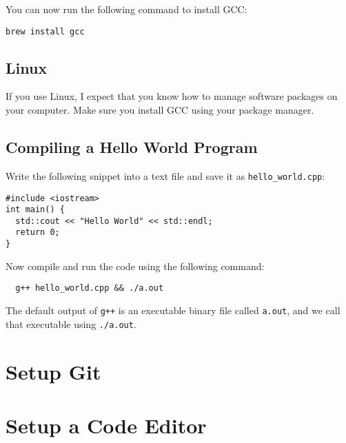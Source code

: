 \documentclass[12pt]{article}
\begin{document}
You can now run the following command to install GCC:
\begin{verbatim}
brew install gcc
\end{verbatim}

\subsection{Linux}

If you use Linux, I expect that you know how to manage software packages on your
computer. Make sure you install GCC using your package manager.

\subsection{Compiling a Hello World Program}

Write the following snippet into a text file and save it as \verb|hello_world.cpp|:
\begin{verbatim}
#include <iostream>
int main() {
  std::cout << "Hello World" << std::endl;
  return 0;
}
\end{verbatim}

Now compile and run the code using the following command:
\begin{verbatim}
  g++ hello_world.cpp && ./a.out
\end{verbatim}
The default output of \verb|g++| is an executable binary file called
\verb|a.out|, and we call that executable using \verb|./a.out|.

\section{Setup Git}



\section{Setup a Code Editor}
\end{document}
